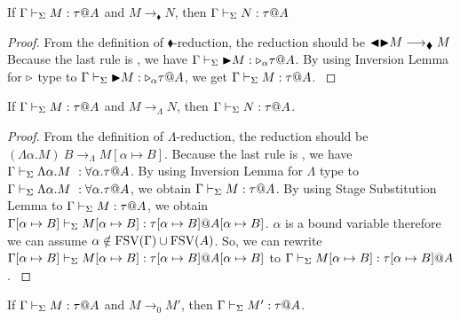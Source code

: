 \begin{lemma}
    \label{lemma:PreservationOnBlackReduction}
    If $\G\V M:\tau@A$ and $M\longrightarrow_\blacklozenge N$, then $\G\V N:\tau@A$\\
\end{lemma}

\begin{proof}
    {
        \newcommand{\R}{\longrightarrow_{\blacklozenge}}
        From the definition of \( \blacklozenge \)-reduction, the reduction should be
        $\TBL\TB M \R M$ Because the last rule is \TTBL, we have $\Gamma \vdash_\Sigma {\mathop{\blacktriangleright}} M :
        {\mathop{\triangleright}}_\alpha \tau @A$.  By using Inversion Lemma for ${\mathop{\triangleright}}$ type to $\Gamma \vdash_\Sigma
        {\mathop{\blacktriangleright}} M : {\mathop{\triangleright}}_\alpha \tau @A$, we get $\Gamma \vdash_\Sigma M : \tau @A$.
    }
\end{proof}

\begin{lemma}
    \label{lemma:PreservationOnLambdaReduction}
    If $\G\V M:\tau@A$ and $M \longrightarrow_{\Lambda} N$, then $\G\V N:\tau@A$.
\end{lemma}

\begin{proof}
    {
        \newcommand{\R}{\longrightarrow_{\Lambda}}
        From the definition of \( \Lambda \)-reduction, the reduction should be
        $(\Lambda\alpha.M)\ B \R M[\alpha \mapsto B]$.  Because the last rule
        is \TIns{}, we have $\Gamma \vdash_\Sigma \Lambda\alpha.M\ : \forall\alpha.\tau @ A$.
        By using Inversion Lemma for $\Lambda$ type to $\Gamma \vdash_\Sigma \Lambda\alpha.M\
        : \forall\alpha.\tau @ A$, we obtain $\Gamma \vdash_\Sigma M : \tau @ A$.  By using
        Stage Substitution Lemma to $\Gamma \vdash_\Sigma M : \tau @ A$, we obtain $\Gamma[\alpha
        \mapsto B] \vdash_\Sigma M[\alpha \mapsto B] : \tau[\alpha \mapsto B] @ A[\alpha
        \mapsto B]$.  $\alpha$ is a bound variable therefore we can assume
        $\alpha \notin \text{FSV}(\Gamma) \cup \text{FSV}(A)$.  So, we can rewrite $\Gamma[\alpha
        \mapsto B] \vdash_\Sigma M[\alpha \mapsto B] : \tau[\alpha \mapsto B] @ A[\alpha
        \mapsto B]$ to $\Gamma \vdash_\Sigma M[\alpha \mapsto B] : \tau[\alpha \mapsto B] @
        A$.
    }
\end{proof}

\begin{lemma}
    \label{lemma:TypePreservationOnLevel0Reduction}
    If \( \Gamma \vdash_\Sigma M : \tau @ A \) and \( M \longrightarrow_0 M' \), then \( \Gamma \vdash_\Sigma M' : \tau @ A \).
\end{lemma}

